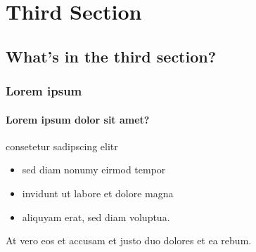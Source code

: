 \documentclass{beamer}
\begin{document}
\section{Third Section}
\subsection{What's in the third section?}

\begin{frame}
	\frametitle{Lorem ipsum}
	\framesubtitle{Lorem ipsum dolor sit amet?}

	\begin{block}{consetetur sadipscing elitr}
		\begin{itemize}
			\item sed diam nonumy eirmod tempor
			\item invidunt ut labore et dolore magna
			\item aliquyam erat, sed diam voluptua.
		\end{itemize}

		At vero eos et accusam et justo duo dolores et ea rebum.
	\end{block}
\end{frame}
\end{document}
